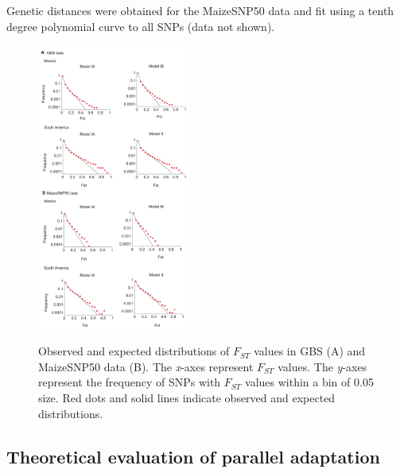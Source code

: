 Genetic distances were obtained for the MaizeSNP50 data \cite[]{Ganal_2011_22174790} and fit using a tenth degree polynomial curve to all SNPs (data not shown).
 


\begin{figure}[tb]   
  \begin{center}
   \vspace{-0mm}
   \includegraphics[width=0.45\textwidth]{fig/Fig5}
   \renewcommand{\baselinestretch}{0.9}
   \vspace{-3mm}
   \caption{Observed and expected distributions of $F_{ST}$ values in GBS (A) and MaizeSNP50 data (B).  The \emph{x}-axes represent $F_{ST}$ values.  The \emph{y}-axes represent the frequency of SNPs with $F_{ST}$ values within a bin of 0.05 size.  Red dots and solid lines indicate observed and expected distributions. 
   }
\vspace{-6mm}
    \label{FstDist}
  \end{center}
\end{figure}


\subsection*{Theoretical evaluation of parallel adaptation }

